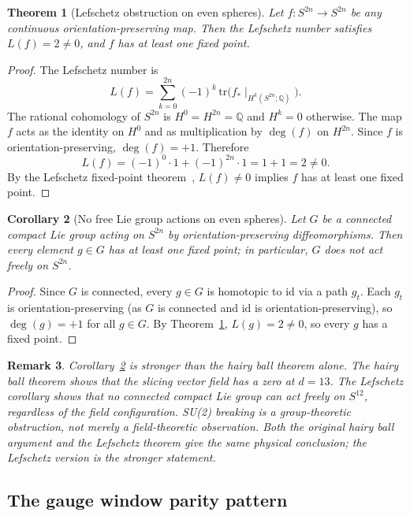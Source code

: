 \documentclass[12pt,a4paper]{article}
\newtheorem{theorem}{Theorem}[section]
\newtheorem{corollary}[theorem]{Corollary}
\newtheorem{remark}[theorem]{Remark}
\begin{document}
\begin{theorem}[Lefschetz obstruction on even spheres]\label{thm:lefschetz}
Let $f\colon S^{2n}\to S^{2n}$ be any continuous orientation-preserving map. Then
the Lefschetz number satisfies $L(f)=2\neq 0$, and $f$ has at least one fixed point.
\end{theorem}
\begin{proof}
The Lefschetz number is
\[
L(f)=\sum_{k=0}^{2n}(-1)^k\,\mathrm{tr}\!\bigl(f_*\mid_{H^k(S^{2n};\mathbb{Q})}\bigr).
\]
The rational cohomology of $S^{2n}$ is $H^0=H^{2n}=\mathbb{Q}$ and $H^k=0$ otherwise.
The map $f$ acts as the identity on $H^0$ and as multiplication by $\deg(f)$ on $H^{2n}$.
Since $f$ is orientation-preserving, $\deg(f)=+1$. Therefore
\[
L(f)=(-1)^0\cdot 1+(-1)^{2n}\cdot 1=1+1=2\neq 0.
\]
By the Lefschetz fixed-point theorem~\cite{lefschetz}, $L(f)\neq 0$ implies $f$ has at
least one fixed point.
\end{proof}

\begin{corollary}[No free Lie group actions on even spheres]\label{cor:no-free}
Let $G$ be a connected compact Lie group acting on $S^{2n}$ by orientation-preserving
diffeomorphisms. Then every element $g\in G$ has at least one fixed point; in particular,
$G$ does not act freely on $S^{2n}$.
\end{corollary}
\begin{proof}
Since $G$ is connected, every $g\in G$ is homotopic to $\mathrm{id}$ via a path $g_t$.
Each $g_t$ is orientation-preserving (as $G$ is connected and $\mathrm{id}$ is
orientation-preserving), so $\deg(g)=+1$ for all $g\in G$. By
Theorem~\ref{thm:lefschetz}, $L(g)=2\neq 0$, so every $g$ has a fixed point.
\end{proof}

\begin{remark}
Corollary~\ref{cor:no-free} is stronger than the hairy ball theorem alone. The hairy ball
theorem shows that the \emph{slicing vector field} has a zero at $d=13$. The Lefschetz
corollary shows that \emph{no connected compact Lie group can act freely on} $S^{12}$,
regardless of the field configuration. SU(2) breaking is a group-theoretic obstruction,
not merely a field-theoretic observation. Both the original hairy ball argument and the
Lefschetz theorem give the same physical conclusion; the Lefschetz version is the stronger
statement.
\end{remark}

\subsection{The gauge window parity pattern}
\end{document}
